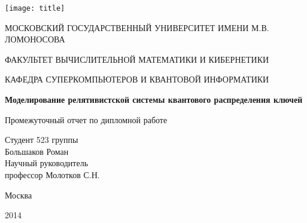 
\begin{titlepage}
  \centerline{\texttt{[image: title]}}
  \centerline{МОСКОВСКИЙ ГОСУДАРСТВЕННЫЙ УНИВЕРСИТЕТ ИМЕНИ М.В. ЛОМОНОСОВА}
  \centerline{ФАКУЛЬТЕТ ВЫЧИСЛИТЕЛЬНОЙ МАТЕМАТИКИ И КИБЕРНЕТИКИ}
  \centerline{КАФЕДРА СУПЕРКОМПЬЮТЕРОВ И КВАНТОВОЙ ИНФОРМАТИКИ}
  \centerline{\hfill\hrulefill\hrulefill\hfill}
  \vfill
  \vfill
  \vfill
  \large
  \vfill
  \Large
  \begin{center}
  {\bf{Моделирование релятивистской системы квантового распределения ключей}}
  \end{center}
  \normalsize
  \vfill
  \vfill
  \centerline{Промежуточный отчет по дипломной работе}
  \vfill
  \vfill
  \begin{flushright}
  Студент 523 группы\\
  Большаков Роман\\
   \vfill
   \vfill
  Научный руководитель\\
  профессор Молотков С.Н.
  \end{flushright}
  \vfill
  \vfill
  \centerline{Москва}
  \centerline{2014}
  \end{titlepage}

